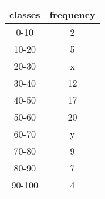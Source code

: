 \documentclass{article}
\begin{document}
\begin{enumerate}
\begin{tabular}{|c|c|}
		\textbf{classes} & \textbf{frequency} \\
\hline
         0-10 & 2 \\
\hline
         10-20 & 5 \\
\hline
         20-30 & x \\
\hline
        30-40 & 12 \\
\hline
        40-50 & 17 \\
\hline
        50-60 & 20 \\
\hline
         60-70 & y \\
\hline
         70-80 & 9 \\
\hline
          80-90 & 7 \\
\hline
          90-100 & 4 \\
\hline
	\end{tabular}
\end{enumerate}
\end{document}
